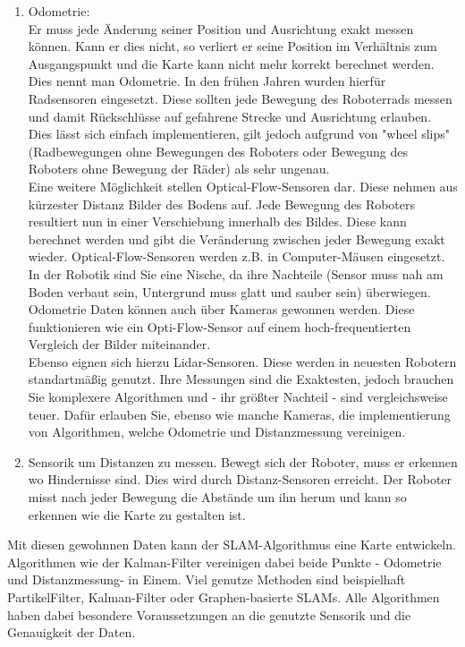 \documentclass[a4paper,cleardoubleempty,BCOR1cm]{book}
\begin{document}
\begin{enumerate}
	\item Odometrie:\\
	 Er muss jede Änderung seiner Position und Ausrichtung exakt messen können. Kann er dies nicht, so verliert er seine Position im Verhältnis zum Ausgangspunkt und die Karte kann nicht mehr korrekt berechnet werden. Dies nennt man Odometrie. In den frühen Jahren wurden hierfür Radsensoren eingesetzt. Diese sollten jede Bewegung des Roboterrads messen und damit Rückschlüsse auf gefahrene Strecke und Ausrichtung erlauben. Dies lässt sich einfach implementieren, gilt jedoch aufgrund von "wheel slips" (Radbewegungen ohne Bewegungen des Roboters oder Bewegung des Roboters ohne Bewegung der Räder) als sehr ungenau. \\
	 Eine weitere Möglichkeit stellen Optical-Flow-Sensoren dar. Diese nehmen aus kürzester Distanz Bilder des Bodens auf. Jede Bewegung des Roboters resultiert nun in einer Verschiebung innerhalb des Bildes. Diese kann berechnet werden und gibt die Veränderung zwischen jeder Bewegung exakt wieder. Optical-Flow-Sensoren werden z.B. in Computer-Mäusen eingesetzt. In der Robotik sind Sie eine Nische, da ihre Nachteile (Sensor muss nah am Boden verbaut sein, Untergrund muss glatt und sauber sein) überwiegen. \\
	 Odometrie Daten können auch über Kameras gewonnen werden. Diese funktionieren wie ein Opti-Flow-Sensor auf einem hoch-frequentierten Vergleich der Bilder miteinander. \\
	 Ebenso eignen sich hierzu Lidar-Sensoren. Diese werden in neuesten Robotern standartmäßig genutzt. Ihre Messungen sind die Exaktesten, jedoch brauchen Sie komplexere Algorithmen und - ihr größter Nachteil - sind vergleichsweise teuer. Dafür erlauben Sie, ebenso wie manche Kameras, die implementierung von Algorithmen, welche Odometrie und Distanzmessung vereinigen. 
	\item Sensorik um Distanzen zu messen. Bewegt sich der Roboter, muss er erkennen wo Hindernisse sind. Dies wird durch Distanz-Sensoren erreicht. Der Roboter misst nach jeder Bewegung die Abstände um ihn herum und kann so erkennen wie die Karte zu gestalten ist. 
\end{enumerate}

Mit diesen gewohnnen Daten kann der SLAM-Algorithmus eine Karte entwickeln. Algorithmen wie der Kalman-Filter vereinigen dabei beide Punkte - Odometrie und Distanzmessung- in Einem. Viel genutze Methoden sind beispielhaft PartikelFilter, Kalman-Filter oder Graphen-basierte SLAMs. Alle Algorithmen haben dabei besondere Voraussetzungen an die genutzte Sensorik und die Genauigkeit der Daten. 
\end{document}

